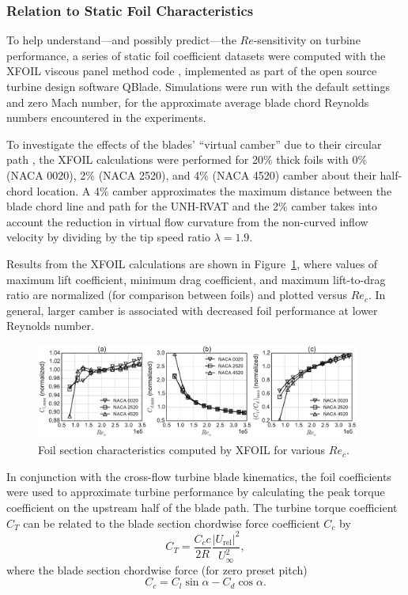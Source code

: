 \documentclass[energies,article,accept,moreauthors,pdftex,12pt,a4paper]{mdpi}
\begin{document}
\subsubsection{Relation to Static Foil Characteristics}

To help understand---and possibly predict---the $Re$-sensitivity on turbine
performance, a series of static foil coefficient datasets were computed with the
XFOIL viscous panel method code \cite{Drela1989}, implemented as part of the
open source turbine design software QBlade. Simulations were run with the
default settings and zero Mach number, for the approximate average blade chord
Reynolds numbers encountered in the experiments.

To investigate the effects of the blades' ``virtual camber'' due to their
circular path \cite{Migliore1980}, the XFOIL calculations were performed for
20\% thick foils with 0\% (NACA 0020), 2\% (NACA 2520), and 4\% (NACA 4520)
camber about their half-chord location. A 4\% camber approximates the maximum
distance between the blade chord line and path for the UNH-RVAT and the 2\%
camber takes into account the reduction in virtual flow curvature from the
non-curved inflow velocity by dividing by the tip speed ratio $\lambda=1.9$.

Results from the XFOIL calculations are shown in Figure~\ref{fig:foil-Re-dep},
where values of maximum lift coefficient, minimum drag coefficient, and maximum
lift-to-drag ratio are normalized (for comparison between foils) and plotted
versus $Re_c$. In general, larger camber is associated with decreased foil
performance at lower Reynolds number.

\begin{figure}[ht!]
\centering
\includegraphics[width=0.95\textwidth]{figures/all_foils_re_dep}
\caption{Foil section characteristics computed by XFOIL for various $Re_c$.}
\label{fig:foil-Re-dep}
\end{figure}

In conjunction with the cross-flow turbine blade kinematics, the foil
coefficients were used to approximate turbine performance by calculating the
peak torque coefficient on the upstream half of the blade path. The turbine
torque coefficient $C_T$ can be related to the blade section chordwise force
coefficient $C_c$ by
\begin{equation}
C_T = \frac{C_c c}{2R} \frac{|U_\mathrm{rel}|^2}{U_\infty^2},
\end{equation}
where the blade section chordwise force (for zero preset pitch)
\begin{equation}
C_c = C_l \sin \alpha - C_d \cos \alpha.
\end{equation}
\end{document}
